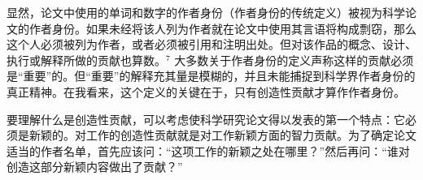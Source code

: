 显然，论文中使用的单词和数字的作者身份（作者身份的传统定义）被视为科学论文的作者身份。如果未经将该人列为作者就在论文中使用其言语将构成剽窃，那么这个人必须被列为作者，或者必须被引用和注明出处。但对该作品的概念、设计、执行或解释所做的贡献也算数。${ }^{7}$ 大多数关于作者身份的定义声称这样的贡献必须是“重要”的。但“重要”的解释充其量是模糊的，并且未能捕捉到科学界作者身份的真正精神。在我看来，这个定义的关键在于，只有创造性贡献才算作作者身份。

要理解什么是创造性贡献，可以考虑使科学研究论文得以发表的第一个特点：它必须是新颖的。对工作的创造性贡献就是对工作新颖方面的智力贡献。为了确定论文适当的作者名单，首先应该问：“这项工作的新颖之处在哪里？”然后再问：“谁对创造这部分新颖内容做出了贡献？”

